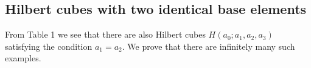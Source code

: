 \documentclass[10pt]{amsart}
\theoremstyle{plain}
\begin{document}


\subsection{Hilbert cubes with two identical base elements}
\bigskip

From Table 1 we see that there are also Hilbert cubes $H(a_{0}; a_{1}, a_{2}, a_{3})$ satisfying the condition $a_{1}=a_{2}$. We prove that there are infinitely many such examples.
\end{document}
